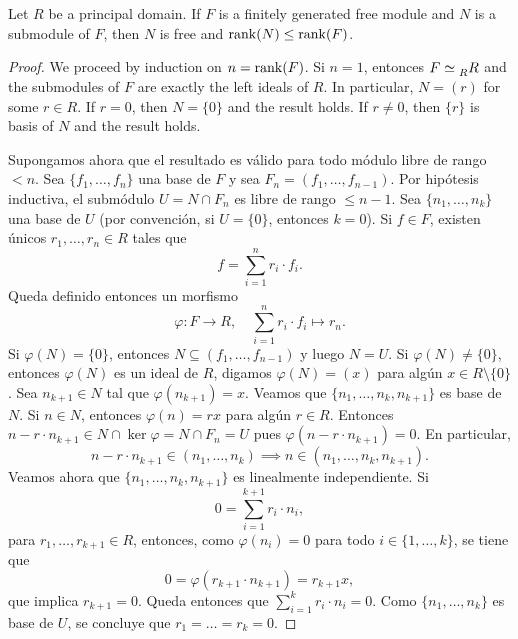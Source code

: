 \chapter{}


\begin{theorem}
\label{thm:rango}
Let $R$ be a principal domain. If $F$ is a finitely generated free module and 
$N$ is a submodule of $F$, then $N$ is free and 
$\operatorname{rank}(N)\leq\operatorname{rank}(F)$. 
\end{theorem}

\begin{proof}
	We proceed by induction on $n=\operatorname{rank}(F)$. Si $n=1$, entonces
	$F\simeq\prescript{}{R}R$ 
	and the submodules of $F$ are exactly the left ideals of $R$. In particular,
	$N=(r)$ for some $r\in R$. If $r=0$, then $N=\{0\}$ and the result holds. If $r\ne 0$, then 
	$\{r\}$ is basis of $N$ and the result holds.
	
	Supongamos ahora que el resultado es válido para todo módulo libre de rango $<n$. 
	Sea $\{f_1,\dots,f_n\}$ una
	base de $F$ y sea $F_n=(f_1,\dots,f_{n-1})$. Por hipótesis inductiva, 
	el submódulo $U=N\cap F_n$ es libre de rango $\leq n-1$. Sea
	$\{n_1,\dots,n_k\}$ una base de $U$ (por convención, si $U=\{0\}$, entonces $k=0$). Si $f\in F$, existen únicos $r_1,\dots,r_n\in R$ tales que 
	\[
	f=\sum_{i=1}^n r_i\cdot f_i.
	\]
	Queda definido 
	entonces un morfismo 
	\[
	\varphi\colon F\to R,
	\quad
	\sum_{i=1}^nr_i\cdot f_i\mapsto r_n.
	\] 
	Si $\varphi(N)=\{0\}$, entonces $N\subseteq (f_1,\dots,f_{n-1})$ y luego $N=U$. 
	Si $\varphi(N)\ne\{0\}$, entonces $\varphi(N)$ es un ideal
	de $R$, digamos $\varphi(N)=(x)$ para algún $x\in R\setminus\{0\}$. Sea $n_{k+1}\in N$ 
	tal que $\varphi(n_{k+1})=x$. 
	Veamos que $\{n_1,\dots,n_k,n_{k+1}\}$ es base de $N$. 
	Si $n\in N$, entonces $\varphi(n)=rx$ 
	para algún $r\in R$. Entonces $n-r\cdot n_{k+1}\in N\cap\ker\varphi=N\cap F_n=U$ pues 
	$\varphi(n-r\cdot n_{k+1})=0$. En particular, 
	\[
	n-r\cdot n_{k+1}\in (n_1,\dots,n_k)\implies  
	n\in (n_1,\dots,n_k,n_{k+1}).
	\]
	Veamos ahora que
	$\{n_1,\dots,n_k,n_{k+1}\}$ es linealmente independiente. Si 
	\[
	0=\sum_{i=1}^{k+1}r_i\cdot n_i,
	\]
	para $r_1,\dots,r_{k+1}\in R$, entonces, como $\varphi(n_i)=0$ para todo $i\in\{1,\dots,k\}$, se tiene que 
	\[
	0=\varphi(r_{k+1}\cdot n_{k+1})=r_{k+1}x,
	\]
	que implica $r_{k+1}=0$. Queda entonces que $\sum_{i=1}^kr_i\cdot n_i=0$. Como $\{n_1,\dots,n_k\}$ es base de $U$, se concluye que
	$r_1=\dots=r_k=0$. 
\end{proof}

